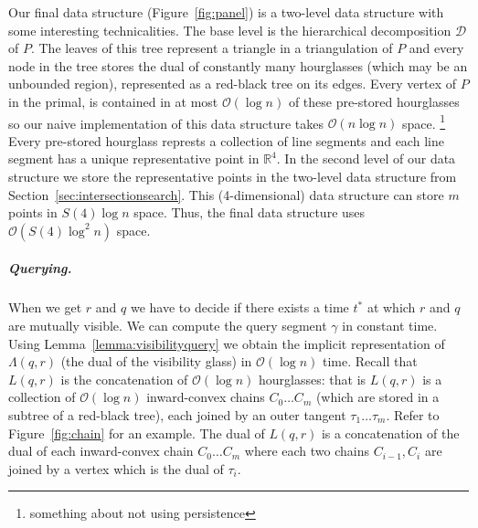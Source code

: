 \documentclass[a4paper, UKenglish]{lipics-v2018}
\begin{document}
Our final data structure (Figure~\ref{fig:panel}) is a two-level data structure with some interesting technicalities. The base level is the hierarchical decomposition $\mathcal{D}$ of $P$. The leaves of this tree represent a triangle in a triangulation of $P$ and every node in the tree stores the dual of constantly many hourglasses (which may be an unbounded region), represented as a red-black tree on its edges. Every vertex of $P$ in the primal, is contained in at most $\mathcal{O}(\log n)$ of these pre-stored hourglasses \cite{FRANK} so our naive implementation of this data structure takes $\mathcal{O}(n \log n)$ space. \footnote{something about not using persistence}
Every pre-stored hourglass represts a collection of line segments and each line segment has a unique representative point in $\mathbb{R}^4$. In the second level of our data structure we store the representative points in the two-level data structure from Section~\ref{sec:intersectionsearch}. This (4-dimensional) data structure can store $m$ points in $S(4) \log n$ space. Thus, the final data structure uses $\mathcal{O}(S(4) \log^2 n)$ space.

\subparagraph{Querying.}
When we get $r$ and $q$ we have to decide if there exists
a time $t^*$ at which $r$ and $q$ are mutually visible. We can compute the query segment $\gamma$ in constant time. Using Lemma~\ref{lemma:visibilityquery} we obtain the implicit representation of $\Lambda(q,r)$ (the dual of the visibility glass) in $\mathcal{O}(\log n)$ time. Recall that $L(q,r)$ is the concatenation of $\mathcal{O}(\log n)$ hourglasses: that is $L(q,r)$ is a collection of $\mathcal{O}(\log n)$ inward-convex chains $C_0 \ldots C_m$ (which are stored in a subtree of a red-black tree), each joined by an outer tangent $\tau_1 \ldots \tau_{m}$. Refer to Figure~\ref{fig:chain} for an example. The dual of $L(q,r)$ is a concatenation of the dual of each inward-convex chain $C_0 \ldots C_m$ where each two chains $C_{i-1}, C_{i}$ are joined by a vertex which is the dual of $\tau_i$. 
\end{document}

